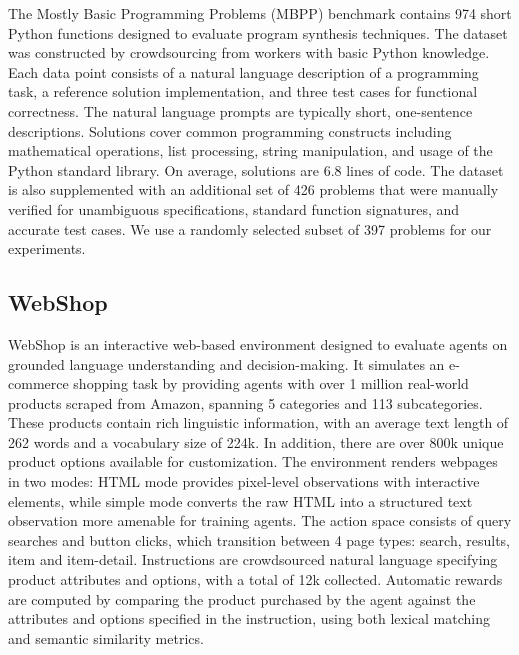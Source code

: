 \documentclass{article} \usepackage{iclr2024_conference,times}
\begin{document}
The Mostly Basic Programming Problems (MBPP) \cite{austin2021program} benchmark contains 974 short Python functions designed to evaluate program synthesis techniques. The dataset was constructed by crowdsourcing from workers with basic Python knowledge. Each data point consists of a natural language description of a programming task, a reference solution implementation, and three test cases for functional correctness. The natural language prompts are typically short, one-sentence descriptions. Solutions cover common programming constructs including mathematical operations, list processing, string manipulation, and usage of the Python standard library. On average, solutions are 6.8 lines of code. The dataset is also supplemented with an additional set of 426 problems that were manually verified for unambiguous specifications, standard function signatures, and accurate test cases. We use a randomly selected subset of 397 problems for our experiments.

\subsection{WebShop}

WebShop \citep{yao2022webshop} is an interactive web-based environment designed to evaluate agents on grounded language understanding and decision-making. It simulates an e-commerce shopping task by providing agents with over 1 million real-world products scraped from Amazon, spanning 5 categories and 113 subcategories. These products contain rich linguistic information, with an average text length of 262 words and a vocabulary size of 224k. In addition, there are over 800k unique product options available for customization. The environment renders webpages in two modes: HTML mode provides pixel-level observations with interactive elements, while simple mode converts the raw HTML into a structured text observation more amenable for training agents. The action space consists of query searches and button clicks, which transition between 4 page types: search, results, item and item-detail. Instructions are crowdsourced natural language specifying product attributes and options, with a total of 12k collected. Automatic rewards are computed by comparing the product purchased by the agent against the attributes and options specified in the instruction, using both lexical matching and semantic similarity metrics. 
\\
\end{document}
